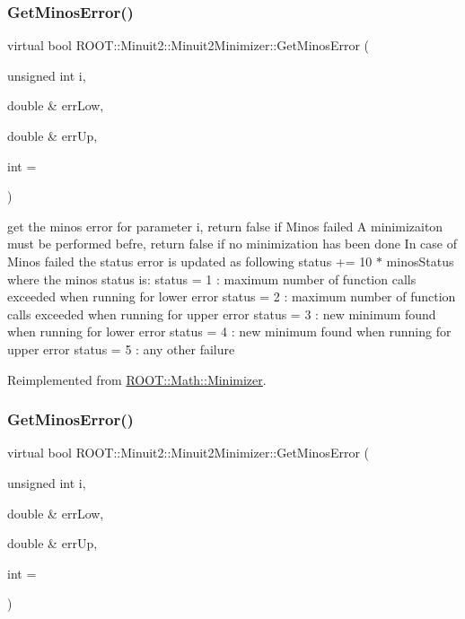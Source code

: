 \subsubsection{\texorpdfstring{GetMinosError()}{GetMinosError()}\hspace{0.1cm}{\footnotesize\ttfamily [1/3]}}
{\footnotesize\ttfamily virtual bool R\+O\+O\+T\+::\+Minuit2\+::\+Minuit2\+Minimizer\+::\+Get\+Minos\+Error (\begin{DoxyParamCaption}\item[{unsigned int}]{i,  }\item[{double \&}]{err\+Low,  }\item[{double \&}]{err\+Up,  }\item[{int}]{ = {} }\end{DoxyParamCaption})\hspace{0.3cm}{\ttfamily [virtual]}}

get the minos error for parameter i, return false if Minos failed A minimizaiton must be performed befre, return false if no minimization has been done In case of Minos failed the status error is updated as following status += 10 $\ast$ minos\+Status where the minos status is\+: status = 1 \+: maximum number of function calls exceeded when running for lower error status = 2 \+: maximum number of function calls exceeded when running for upper error status = 3 \+: new minimum found when running for lower error status = 4 \+: new minimum found when running for upper error status = 5 \+: any other failure 

Reimplemented from \mbox{\hyperlink{classROOT_1_1Math_1_1Minimizer_aeaef75b766eff7088939259c842ab056}{R\+O\+O\+T\+::\+Math\+::\+Minimizer}}.

\mbox{\label{classROOT_1_1Minuit2_1_1Minuit2Minimizer_ab6c27c6f165821774dd304561e8956f5}} 
\subsubsection{\texorpdfstring{GetMinosError()}{GetMinosError()}\hspace{0.1cm}{\footnotesize\ttfamily [2/3]}}
{\footnotesize\ttfamily virtual bool R\+O\+O\+T\+::\+Minuit2\+::\+Minuit2\+Minimizer\+::\+Get\+Minos\+Error (\begin{DoxyParamCaption}\item[{unsigned int}]{i,  }\item[{double \&}]{err\+Low,  }\item[{double \&}]{err\+Up,  }\item[{int}]{ = {} }\end{DoxyParamCaption})\hspace{0.3cm}{\ttfamily [virtual]}}

